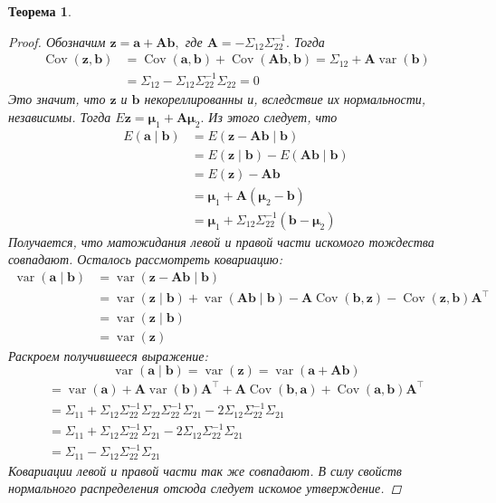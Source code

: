 \documentclass[12pt, twoside]{article}
\newcommand{\bA}{{\mathbf{A}}}
\newcommand{\ba}{{\mathbf{a}}}
\newcommand{\bb}{{\mathbf{b}}}
\newcommand{\bz}{{\mathbf{z}}}
\newtheorem{theorem}{Теорема}
\begin{document}
\begin{theorem}
\begin{proof}
Обозначим $\bz=\ba+\bA \bb,$ где $\bA=-\Sigma_{12} \Sigma_{22}^{-1} .$ Тогда
$$
\begin{aligned}
\operatorname{Cov}\left(\bz, \bb\right) &=\operatorname{Cov}\left(\ba, \bb\right)+\operatorname{Cov}\left(\bA \bb, \bb\right) =\Sigma_{12}+\bA \operatorname{var}\left(\bb\right) \\
&=\Sigma_{12}-\Sigma_{12} \Sigma_{22}^{-1} \Sigma_{22}=0
\end{aligned}
$$
Это значит, что $\bz$ и $\bb$ некореллированны и, вследствие их нормальности, независимы. Тогда $E\bz=\boldsymbol{\mu}_{1}+\bA \boldsymbol{\mu}_{2}.$ Из этого следует, что
$$
\begin{aligned}
E\left(\ba \mid \bb\right) &=E\left(\bz-\bA \bb \mid \bb\right) \\
&=E\left(\bz \mid \bb\right)-E\left(\bA \bb \mid \bb\right) \\
&=E(\bz)-\bA \bb \\
&=\boldsymbol{\mu}_{1}+\bA\left(\boldsymbol{\mu}_{2}-\bb\right) \\
&=\boldsymbol{\mu}_{1}+\Sigma_{12} \Sigma_{22}^{-1}\left(\bb-\boldsymbol{\mu}_{2}\right)
\end{aligned}
$$
Получается, что матожидания левой и правой части искомого тождества совпадают. Осталось рассмотреть ковариацию:
$$
\begin{aligned}
\operatorname{var}\left(\ba \mid \bb\right) &=\operatorname{var}\left(\bz-\bA \bb \mid \bb\right) \\
&=\operatorname{var}\left(\bz \mid \bb\right)+\operatorname{var}\left(\bA \bb \mid \bb\right)-\bA \operatorname{Cov}\left(\bb,\bz\right)-\operatorname{Cov}\left(\bz,\bb\right) \bA^{\top} \\
&=\operatorname{var}\left(\bz \mid \bb\right) \\
&=\operatorname{var}(\bz)
\end{aligned}
$$
Раскроем получившееся выражение:
$$
\operatorname{var}\left(\ba \mid \bb\right)=\operatorname{var}(\bz)=\operatorname{var}\left(\ba+\bA \bb\right)
$$
$$
\begin{array}{l}
=\operatorname{var}\left(\ba\right)+\bA \operatorname{var}\left(\bb\right) \bA^{\top}+\bA \operatorname{Cov}\left(\bb, \ba\right)+\operatorname{Cov}\left(\ba, \bb\right) \bA^{\top} \\
=\Sigma_{11}+\Sigma_{12} \Sigma_{22}^{-1} \Sigma_{22} \Sigma_{22}^{-1} \Sigma_{21}-2 \Sigma_{12} \Sigma_{22}^{-1} \Sigma_{21} \\
=\Sigma_{11}+\Sigma_{12} \Sigma_{22}^{-1} \Sigma_{21}-2 \Sigma_{12} \Sigma_{22}^{-1} \Sigma_{21} \\
=\Sigma_{11}-\Sigma_{12} \Sigma_{22}^{-1} \Sigma_{21}
\end{array}
$$
Ковариации левой и правой части так же совпадают. В силу свойств нормального распределения отсюда следует искомое утверждение.
\end{proof}

\end{theorem}
\end{document}
